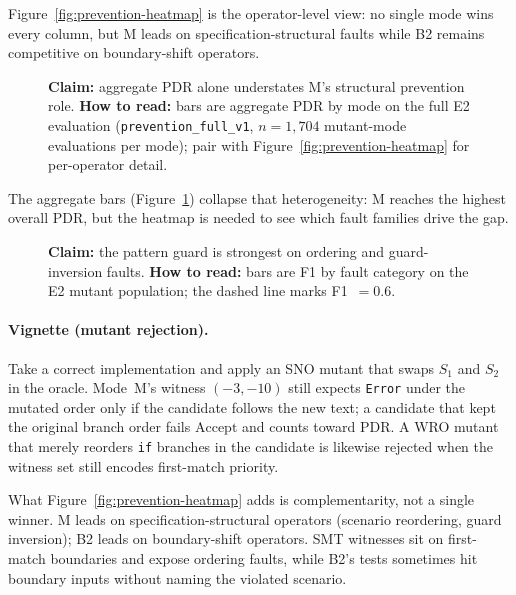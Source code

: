 Figure~\ref{fig:prevention-heatmap} is the operator-level view: no single mode
wins every column, but M leads on specification-structural faults while B2
remains competitive on boundary-shift operators.

\begin{figure}[t]
  \centering
  \caption{\textbf{Claim:} aggregate PDR alone understates M's structural
    prevention role.
    \textbf{How to read:} bars are aggregate PDR by mode on the full E2
    evaluation (\texttt{prevention\_full\_v1}, $n{=}1{,}704$ mutant-mode
    evaluations per mode); pair with Figure~\ref{fig:prevention-heatmap} for
    per-operator detail.}
  \label{fig:prevention-bar}
\end{figure}

The aggregate bars (Figure~\ref{fig:prevention-bar}) collapse that heterogeneity:
M reaches the highest overall PDR, but the heatmap is needed to see which
fault families drive the gap.

\begin{figure}[t]
  \centering
  \caption{\textbf{Claim:} the pattern guard is strongest on ordering and
    guard-inversion faults.
    \textbf{How to read:} bars are F1 by fault category on the E2 mutant
    population; the dashed line marks F1~$=0.6$.}
  \label{fig:pattern-f1}
\end{figure}

\paragraph{Vignette (mutant rejection).}
Take a correct  implementation and apply an SNO mutant
that swaps $S_1$ and $S_2$ in the oracle.
Mode~M's witness $(-3,-10)$ still expects \texttt{Error} under the mutated
order only if the candidate follows the new text; a candidate that kept the
original branch order fails $\mathrm{Accept}$ and counts toward PDR.
A WRO mutant that merely reorders \texttt{if} branches in the candidate is
likewise rejected when the witness set still encodes first-match priority.

What Figure~\ref{fig:prevention-heatmap} adds is complementarity, not a single
winner.
M leads on specification-structural operators (scenario reordering, guard
inversion); B2 leads on boundary-shift operators.
SMT witnesses sit on first-match boundaries and expose ordering faults, while
B2's tests sometimes hit boundary inputs without naming the violated scenario.

